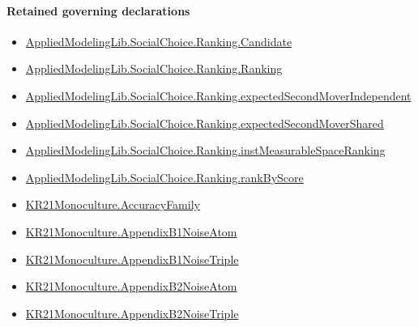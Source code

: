 \documentclass[10pt]{article}
\begin{document}
\paragraph{Retained governing declarations}
\begin{itemize}\raggedright
\item \hyperlink{library-prerequisite-8c0e6c25845ae78a}{Applied\allowbreak{}Modeling\allowbreak{}Lib.\allowbreak{}Social\allowbreak{}Choice.\allowbreak{}Ranking.\allowbreak{}Candidate}
\item \hyperlink{library-prerequisite-5cde54446d1ae021}{Applied\allowbreak{}Modeling\allowbreak{}Lib.\allowbreak{}Social\allowbreak{}Choice.\allowbreak{}Ranking.\allowbreak{}Ranking}
\item \hyperlink{governing-declaration-4f697449f42135d1}{Applied\allowbreak{}Modeling\allowbreak{}Lib.\allowbreak{}Social\allowbreak{}Choice.\allowbreak{}Ranking.\allowbreak{}expected\allowbreak{}Second\allowbreak{}Mover\allowbreak{}Independent}
\item \hyperlink{governing-declaration-864c9bb19be5af0d}{Applied\allowbreak{}Modeling\allowbreak{}Lib.\allowbreak{}Social\allowbreak{}Choice.\allowbreak{}Ranking.\allowbreak{}expected\allowbreak{}Second\allowbreak{}Mover\allowbreak{}Shared}
\item \hyperlink{governing-declaration-30ca9c740ef703ec}{Applied\allowbreak{}Modeling\allowbreak{}Lib.\allowbreak{}Social\allowbreak{}Choice.\allowbreak{}Ranking.\allowbreak{}inst\allowbreak{}Measurable\allowbreak{}Space\allowbreak{}Ranking}
\item \hyperlink{governing-declaration-c2e98278351275b0}{Applied\allowbreak{}Modeling\allowbreak{}Lib.\allowbreak{}Social\allowbreak{}Choice.\allowbreak{}Ranking.\allowbreak{}rank\allowbreak{}By\allowbreak{}Score}
\item \hyperlink{paper-prerequisite-a1353b2b1b6f0303}{KR21\allowbreak{}Monoculture.\allowbreak{}Accuracy\allowbreak{}Family}
\item \hyperlink{governing-declaration-792cef0e45be0c6d}{KR21\allowbreak{}Monoculture.\allowbreak{}Appendix\allowbreak{}B1\allowbreak{}Noise\allowbreak{}Atom}
\item \hyperlink{governing-declaration-772881b315f3e73e}{KR21\allowbreak{}Monoculture.\allowbreak{}Appendix\allowbreak{}B1\allowbreak{}Noise\allowbreak{}Triple}
\item \hyperlink{governing-declaration-a251de733d2f986a}{KR21\allowbreak{}Monoculture.\allowbreak{}Appendix\allowbreak{}B2\allowbreak{}Noise\allowbreak{}Atom}
\item \hyperlink{governing-declaration-5e2e57dad411ac3e}{KR21\allowbreak{}Monoculture.\allowbreak{}Appendix\allowbreak{}B2\allowbreak{}Noise\allowbreak{}Triple}

\end{itemize}
\end{document}
